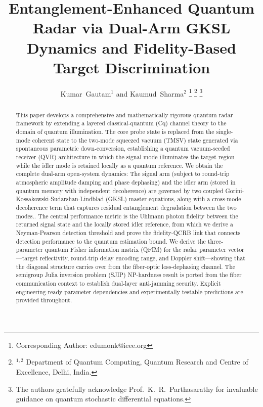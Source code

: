 \documentclass[journal]{IEEEtran}
\begin{document}
\title{Entanglement-Enhanced Quantum Radar via Dual-Arm GKSL Dynamics and Fidelity-Based Target Discrimination}

\author{Kumar~Gautam{$^1$} and Kaumud~Sharma{$^2$}
\thanks{Corresponding Author: edumonk@ieee.org}
\thanks{{$^{1,2}$} Department of Quantum Computing, Quantum Research and Centre of Excellence, Delhi, India.}
\thanks{The authors gratefully acknowledge Prof.~K.~R.~Parthasarathy for invaluable guidance on quantum stochastic differential equations.}
}

\maketitle

\begin{abstract}
This paper develops a comprehensive and mathematically rigorous quantum radar framework by extending a layered classical-quantum (Cq) channel theory to the domain of quantum illumination. The core probe state is replaced from the single-mode coherent state to the two-mode squeezed vacuum (TMSV) state generated via spontaneous parametric down-conversion, establishing a quantum vacuum-seeded receiver (QVR) architecture in which the signal mode illuminates the target region while the idler mode is retained locally as a quantum reference. We obtain the complete dual-arm open-system dynamics: The signal arm (subject to round-trip atmospheric amplitude damping and phase dephasing) and the idler arm (stored in quantum memory with independent decoherence) are governed by two coupled Gorini-Kossakowski-Sudarshan-Lindblad (GKSL) master equations, along with a cross-mode decoherence term that captures residual entanglement degradation between the two modes.. The central performance metric is the Uhlmann photon fidelity between the returned signal state and the locally stored idler reference, from which we derive a Neyman-Pearson detection threshold and prove the fidelity-QCRB link that connects detection performance to the quantum estimation bound. We derive the three-parameter quantum Fisher information matrix (QFIM) for the radar parameter vector—target reflectivity, round-trip delay encoding range, and Doppler shift—showing that the diagonal structure carries over from the fiber-optic loss-dephasing channel. The semigroup Julia inversion problem (SJIP) NP-hardness result is ported from the fiber communication context to establish dual-layer anti-jamming security. Explicit engineering-ready parameter dependencies and experimentally testable predictions are provided throughout.
\end{abstract}
\end{document}
